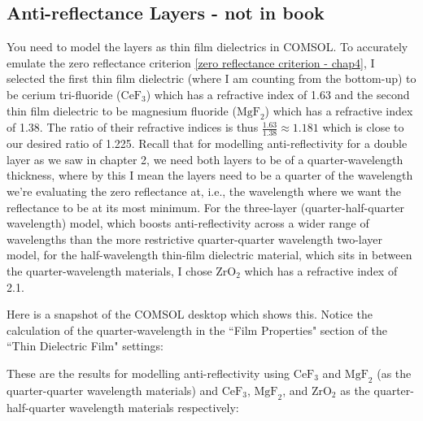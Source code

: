 
\subsection{Anti-reflectance Layers - not in book}

You need to model the layers as thin film dielectrics in COMSOL. To accurately emulate the zero reflectance criterion \ref{zero reflectance criterion - chap4}, I selected the first thin film dielectric (where I am counting from the bottom-up) to be cerium tri-fluoride ($\text{CeF}_3$) which has a refractive index of 1.63 and the second thin film dielectric to be magnesium fluoride ($\text{MgF}_2$) which has a refractive index of 1.38. The ratio of their refractive indices is thus $\frac{1.63}{1.38} \approx 1.181$ which is close to our desired ratio of 1.225. Recall that for modelling anti-reflectivity for a double layer as we saw in chapter 2, we need both layers to be of a quarter-wavelength thickness, where by this I mean the layers need to be a quarter of the wavelength we're evaluating the zero reflectance at, i.e., the wavelength where we want the reflectance to be at its most minimum. For the three-layer (quarter-half-quarter wavelength) model, which boosts anti-reflectivity across a wider range of wavelengths than the more restrictive quarter-quarter wavelength two-layer model, for the half-wavelength thin-film dielectric material, which sits in between the quarter-wavelength materials, I chose $\text{ZrO}_2$ which has a refractive index of 2.1.

Here is a snapshot of the COMSOL desktop which shows this. Notice the calculation of the quarter-wavelength in the ``Film Properties" section of the ``Thin Dielectric Film" settings:



These are the results for modelling anti-reflectivity using $\text{CeF}_3$ and $\text{MgF}_2$ (as the quarter-quarter wavelength materials) and $\text{CeF}_3$, $\text{MgF}_2$, and $\text{ZrO}_2$ as the quarter-half-quarter wavelength materials respectively:

